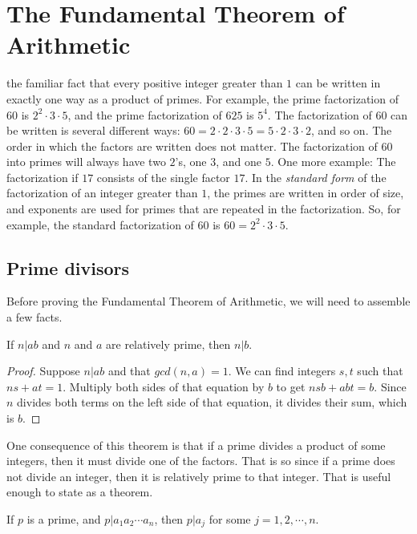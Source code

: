 \chapter{The Fundamental Theorem of Arithmetic}

 the familiar fact that 
every positive integer greater than $1$ can be written in exactly one 
way as a product of primes. For example, the prime factorization
of $60$ is $2^2\cdot3\cdot5$, and the prime factorization of
$625$ is $5^4$. The factorization of $60$ can be written is several
different ways: $60 = 2\cdot2\cdot3\cdot5 = 5\cdot2\cdot3\cdot2$, and so
on. The order in which the factors are written does not matter. The
factorization of $60$ into primes will always have two $2$'s, one $3$,
and one $5$. One more example: The factorization if $17$ 
consists of the single factor $17$. In the {\it standard form} of
the factorization of an integer greater than $1$, the primes are
written in order of size, and  exponents are used for primes
that are repeated in the factorization. So, for example, the
standard factorization of $60$ is $60 = 2^2\cdot3\cdot5$.

\section{Prime divisors}
Before proving the Fundamental Theorem of Arithmetic, we will need 
to assemble a few facts.

\begin{thm}
If $n|ab$ and $n$ and $a$ are relatively prime, then $n|b$.
\end{thm}
\begin{proof}
Suppose $n|ab$ and that $gcd(n,a)=1$. We can
find integers $s,t$ such that $ns+at = 1$. Multiply both sides of that
equation by $b$ to get $nsb + abt = b$. Since $n$ divides both
terms on the left side of that equation, it divides their sum, which
is $b$.
\end{proof}

One consequence of this theorem is that if a prime divides a product
of some integers, then it must divide one of the factors. That is so
since if a prime does not divide an integer, then it is relatively prime
to that integer. That is useful enough to state as a theorem.

\begin{thm}
If $p$ is a prime, and $p|a_1a_2\cdots a_n$, then
$p|a_j$ for some $j=1,2,\cdots,n$.
\end{thm}
 
